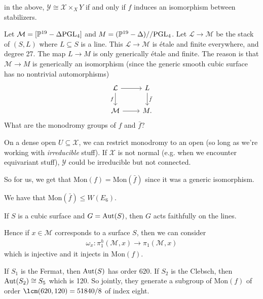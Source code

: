 \documentclass[11pt]{amsart}
\providecommand{\Mon}{\mathrm{Mon}}
\begin{document}
\begin{claim} in the above, $\mathcal{Y} \cong \mathcal{X} \times_{X} Y$ if and only if $f$ induces an isomorphism between stabilizers.
\end{claim}

\begin{example} Let $\mathcal{M} = [\mathbb{P}^{19}- \Delta\mathrm{PGL}_4]$ and $M = (\mathbb{P}^{19}-\Delta)//\mathrm{PGL}_4$. Let $\mathcal{L} \to \mathcal{M}$ be the stack of $(S,L)$ where $L \subseteq S$ is a line. This $\mathcal{L} \to \mathcal{M}$ is \'etale and finite everywhere, and degree 27. The map $L \to M$ is only generically \'etale and finite. The reason is that $\mathcal{M} \to M$ is generically an isomorphism (since the generic smooth cubic surface has no nontrivial automorphisms)
\[\begin{tikzcd}
    \mathcal{L}\rar\dar["f" left] & L\dar["\bar{f}" right]\\
    \mathcal{M}\rar & M.
\end{tikzcd} \]
What are the monodromy groups of $f$ and $\bar{f}$?
\end{example}

\begin{fact} On a dense open $U \subseteq \mathcal{X}$, we can restrict monodromy to an open (so long as we're working with \textit{irreducible} stuff). If $\mathcal{X}$ is not normal (e.g. when we encounter equivariant stuff), $\mathcal{Y}$ could be irreducible but not connected.
\end{fact}

So for us, we get that $\Mon(f) = \Mon(\bar{f})$ since it was a generic isomorphism.

\begin{fact} We have that $\Mon(\bar{f}) \le W(E_6)$.
\end{fact}

\begin{fact} If $S$ is a cubic surface and $G = \mathrm{Aut}(S)$, then $G$ acts faithfully on the lines.
\end{fact}

Hence if $x\in \mathcal{M}$ corresponds to a surface $S$, then we can consider
\begin{align*}
    \omega_x \colon \pi_1^h(\mathcal{M},x) \to \pi_1(\mathcal{M},x)
\end{align*}
which is injective and it injects in $\Mon(f)$.

If $S_1$ is the Fermat, then $\mathrm{Aut}(S)$ has order $620$. If $S_2$ is the Clebsch, then $\mathrm{Aut}(S_2)\cong S_5$ which is 120. So jointly, they generate a subgroup of $\Mon(f)$ of order $\lcm(620,120) = 51840/8$ of index eight.
\end{document}
